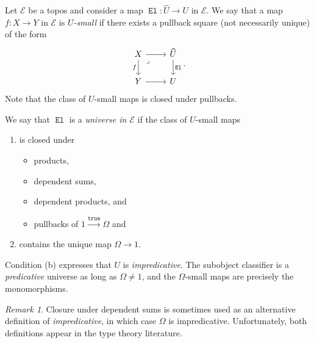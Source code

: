 \documentclass[10pt,letterpaper,cm]{nupset}
\theoremstyle{definition}
\theoremstyle{theorem}
\theoremstyle{remark}
\newtheorem{remark}[definition]{Remark}
\newcommand{\1}{\mathbf{1}}
\newcommand{\e}{\mathscr{E}}
\newcommand{\0}{\vec 0}
\DeclareMathOperator{\true}{\mathtt{true}}
\DeclareMathOperator{\el}{\mathtt{El}}
\newcommand{\bi}{\begin{itemize}}
\newcommand{\ei}{\end{itemize}}
\newcommand{\be}{\begin{enumerate}}
\newcommand{\ee}{\end{enumerate}}
\begin{document}
\medskip

Let $\e$ be a topos and consider a map $\el : \widehat{U} \to U$ in $\e$. We say that a map $f: X \to Y$ in $\e$ is \textit{$U$-small} if there exists a pullback square (not necessarily unique) of the form  
\[
\begin{tikzcd}[ampersand replacement=\&]
	X \& {\widehat{U}} \\
	Y \& U
	\arrow["\el", from=1-2, to=2-2]
	\arrow[from=2-1, to=2-2]
	\arrow["f"', from=1-1, to=2-1]
	\arrow[from=1-1, to=1-2]
	\arrow["\lrcorner"{anchor=center, pos=0.125}, draw=none, from=1-1, to=2-2]
\end{tikzcd}
.\] Note that the class of $U$-small maps is closed under pullbacks.

\medskip

We say that $\el$ is a \textit{universe  in $\e$} if the class of $U$-small maps 
\be[label=(\alph*)]
\item is closed under  
\bi
\item products,  
\item dependent sums,
\item dependent products, and 
\item pullbacks of $1 \xrightarrow{\true} \Omega$ and
\ei
\item contains the unique map $\Omega \to 1$.
\ee 
Condition (b) expresses that $U$ is \textit{impredicative}.
The subobject classifier is a \emph{predicative} universe as long as $\Omega \ne 1$, and the $\Omega$-small maps are precisely the monomorphisms.

\begin{remark}
Closure under dependent sums is sometimes used as an alternative definition of \textit{impredicative}, in which case $\Omega$ is impredicative. Unfortunately, both definitions appear in the type theory literature.
\end{remark}
\end{document}
